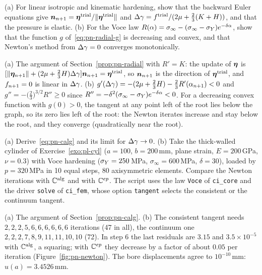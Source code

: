 
\label{exo:pn-radial}
%
(a) For linear isotropic and kinematic hardening, show that the backward
Euler equations give $\bm{n}_{n+1}=\bm{\eta}^{\mathrm{trial}}/\lVert \bm{\eta}^{\mathrm{trial}}\rVert$ and
$\Delta\gamma=f^{\mathrm{trial}}/(2\mu+\tfrac23(K+H))$, and that the pressure is elastic.
(b) For the Voce law $R(\alpha)=\sigma_\infty-(\sigma_\infty-\sigma_{Y})e^{-\delta\alpha}$,
show that the function $g$ of~\eqref{eq:pn-radial-g} is decreasing and
convex, and that Newton's method from $\Delta\gamma=0$ converges monotonically.
\begin{solution}
(a) The argument of Section~\ref{prop:pn-radial} with $R'=K$: the update of
$\bm{\eta}$ is $[\lVert \bm{\eta}_{n+1}\rVert+(2\mu+\tfrac23H)\Delta\gamma]\bm{n}_{n+1}=\bm{\eta}^{\mathrm{trial}}$, so
$\bm{n}_{n+1}$ is the direction of $\bm{\eta}^{\mathrm{trial}}$, and $f_{n+1}=0$ is linear in $\Delta\gamma$.
(b) $g'(\Delta\gamma)=-(2\mu+\tfrac23H)-\tfrac23R'(\alpha_{n+1})<0$ and
$g''=-\bigl(\tfrac23\bigr)^{3/2}R''\ge0$ since $R''=-\delta^2(\sigma_\infty-\sigma_{Y})e^{-\delta\alpha}<0$.
For a decreasing convex function with $g(0)>0$, the tangent at any point left
of the root lies below the graph, so its zero lies left of the root: the
Newton iterates increase and stay below the root, and they converge
(quadratically near the root).
\end{solution}

\label{exo:pn-tangent}
%
(a) Derive~\eqref{eq:pn-calg} and its limit for $\Delta\gamma\to0$. (b) Take the
thick-walled cylinder of Exercise~\ref{exo:pl-cyl} ($a=100$, $b=200$\,mm,
plane strain, $E=200$\,GPa, $\nu=0.3$) with Voce hardening ($\sigma_{Y}=250$\,MPa,
$\sigma_\infty=600$\,MPa, $\delta=30$), loaded by $p=320$\,MPa in 10 equal
steps, 80 axisymmetric elements. Compare the Newton iterations with
$\mathbb{C}^{\mathrm{alg}}$ and with $\mathbb{C}^{ep}$. The script uses the law \texttt{Voce} of
\texttt{ci\_core} and the driver \texttt{solve} of \texttt{ci\_fem}, whose
option \texttt{tangent} selects the consistent or the continuum tangent.
\begin{solution}
(a) The argument of Section~\ref{prop:pn-calg}. (b) The consistent tangent needs
$2,2,2,5,6,6,6,6,6,6$ iterations (47 in all), the continuum one
$2,2,2,7,8,9,11,11,10,10$ (72). In step 6 the last residuals are
$3.15$ and $3.5\times10^{-5}$ with $\mathbb{C}^{\mathrm{alg}}$, a squaring; with $\mathbb{C}^{ep}$ they
decrease by a factor of about $0.05$ per iteration (Figure~\ref{fig:pn-newton}).
The bore displacements agree to $10^{-10}$\,mm: $u(a)=3.4526$\,mm.

\end{solution}

